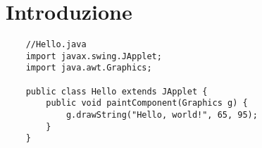 \chapter{Introduzione}

\begin{lstlisting}
	//Hello.java
	import javax.swing.JApplet;
	import java.awt.Graphics;
	
	public class Hello extends JApplet {
		public void paintComponent(Graphics g) {
			g.drawString("Hello, world!", 65, 95);
		}    
	}
\end{lstlisting}